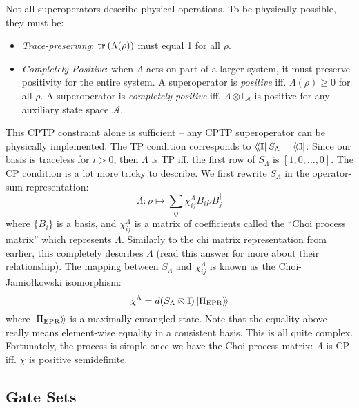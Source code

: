 Not all superoperators describe physical operations. To be physically possible, they must be:
\begin{itemize}
    \item \textit{Trace-preserving}: $\text{tr}_{}\left(\Lambda(\rho)\right)$ must equal 1 for all $\rho$.
    \item \textit{Completely Positive}: when $\Lambda$ acts on part of a larger system, it must
    preserve positivity for the entire system. A superoperator is \textit{positive} iff.
    $\Lambda(\rho) \ge 0$ for all $\rho$. A superoperator is \textit{completely positive} iff.
    $\Lambda \otimes \mathbb{I}_{\mathcal{A}}$ is positive for any auxiliary state space
    $\mathcal{A}$.
\end{itemize}
This \ac{CPTP} constraint alone is sufficient -- any \ac{CPTP} superoperator can be physically
implemented. The TP condition corresponds to $\langle\!\bra{\mathbb{I}} S_{\Lambda} =
\langle\!\bra{\mathbb{I}}$. Since our basis is traceless for $i > 0$, then $\Lambda$ is TP iff. the
first row of $S_{\Lambda}$ is $[1, 0, \dots, 0]$. The CP condition is a lot more tricky to describe.
We first rewrite $S_{\Lambda}$ in the operator-sum representation:
\begin{equation}
    \Lambda : \rho \mapsto \sum_{ij} \chi_{ij}^{\Lambda} B_i \rho B_j^{\dagger}
\end{equation}
where $\{B_i\}$ is a basis, and $\chi_{ij}^{\Lambda}$ is a matrix of coefficients called the ``Choi
process matrix'' which represents $\Lambda$. Similarly to the chi matrix representation from
earlier, this completely describes $\Lambda$ (read
\href{https://quantumcomputing.stackexchange.com/a/11814}{this answer} for more about their
relationship). The mapping between $S_{\Lambda}$ and $\chi_{ij}^{\Lambda}$ is known as the
Choi-Jamiołkowski isomorphism:
\begin{equation}
    \chi^{\Lambda} = d(S_{\Lambda} \otimes \mathbb{I}) \ket{\Pi_{\text{EPR}}}\!\rangle
\end{equation}
where $\ket{\Pi_{\text{EPR}}}\!\rangle$ is a maximally entangled state. Note that the equality above
really means element-wise equality in a consistent basis. This is all quite complex. Fortunately,
the process is simple once we have the Choi process matrix: $\Lambda$ is CP iff. $\chi$ is positive
semidefinite. 

\subsection{Gate Sets}

